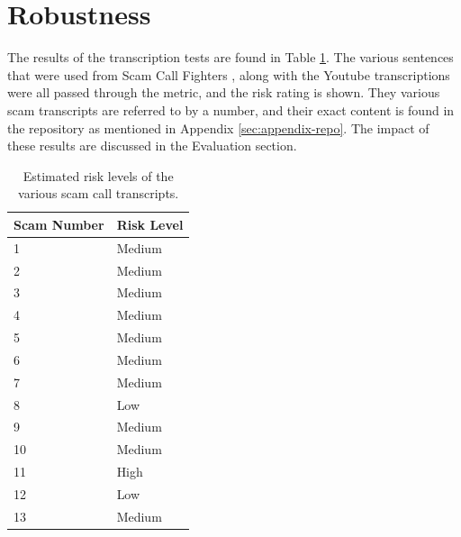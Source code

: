 \documentclass[main.tex]{subfiles}
\begin{document}
\section{Robustness}
The results of the transcription tests are found in Table \ref{tbl:robust}. The various sentences that were used from Scam Call Fighters \cite{spam-calls}, along with the Youtube transcriptions were all passed through the metric, and the risk rating is shown. They various scam transcripts are referred to by a number, and their exact content is found in the repository as mentioned in Appendix \ref{sec:appendix-repo}. The impact of these results are discussed in the Evaluation section.

\begin{table}[htb]
\centering
\begin{tabular}{|l|l|}
	\hline
\textbf{Scam Number} & \textbf{Risk Level}                                 \\\hline
1           & Medium                                                    \\
2           & Medium                                                   \\
3           & Medium                                                 \\
4           & Medium                                                 \\
5           & Medium                                                 \\
6           & Medium                                                \\
7           & Medium                                                \\
8           & Low                                                \\
9           & Medium                                                \\
10           & Medium                                                \\
11           & High                                                \\
12           & Low                                                \\
13           & Medium  \\\hline
\end{tabular}
\caption{Estimated risk levels of the various scam call transcripts. }
\label{tbl:robust}
\end{table}
\end{document}
